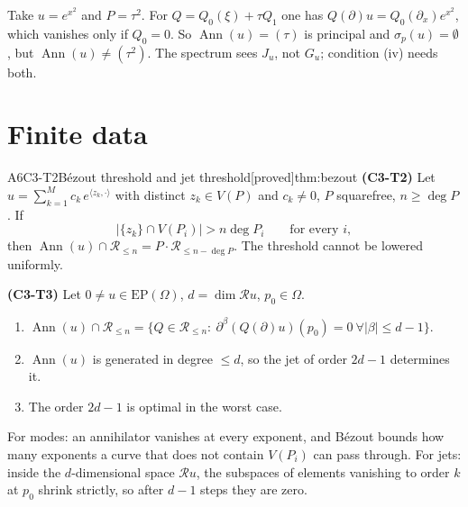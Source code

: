 \documentclass[11pt,a4paper,oneside]{report}
\newcommand{\badge}[2]{\textcolor{#1}{\textsf{\footnotesize[#2]}}}
\newcommand{\proved}{\badge{cC}{proved}}
\newcommand{\Ann}{\operatorname{Ann}}
\newcommand{\EP}{\mathrm{EP}}
\newcommand{\ring}{\mathcal{R}}
\newcommand{\Var}{V}
\DeclareMathOperator{\dimc}{dim}
\newenvironment{dimcard}[5]{\par\Needspace{12\baselineskip}\begin{dimcardbox}{#1}{#2}{#3}{#4}{#5}}{\end{dimcardbox}}
\begin{document}
\begin{caution}[title={An empty spectrum alone is not enough}]
Take $u=e^{x^2}$ and $P=\tau^2$. For $Q=Q_0(\xi)+\tau Q_1$ one has $Q(\partial)u=Q_0(\partial_x)e^{x^2}$, which vanishes only if $Q_0=0$. So $\Ann(u)=(\tau)$ is principal and $\sigma_p(u)=\emptyset$, but $\Ann(u)\ne(\tau^2)$. The spectrum sees $J_u$, not $G_u$; condition (iv) needs both.
\end{caution}

\section{Finite data}

\begin{dimcard}{A6}{C3-T2}{B\'ezout threshold and jet threshold}{\proved}{thm:bezout}
\textbf{(C3-T2)} Let $u=\sum_{k=1}^Mc_k\,e^{\langle z_k,\cdot\rangle}$ with distinct $z_k\in\Var(P)$ and $c_k\ne0$, $P$ squarefree, $n\ge\deg P$. If
\[
\big|\{z_k\}\cap\Var(P_i)\big|>n\deg P_i\qquad\text{for every }i,
\]
then $\Ann(u)\cap\ring_{\le n}=P\cdot\ring_{\le n-\deg P}$. The threshold cannot be lowered uniformly.

\label{dim:C3-T3}\textbf{(C3-T3)} Let $0\ne u\in\EP(\Omega)$, $d=\dimc\ring u$, $p_0\in\Omega$.
\begin{enumerate}[label=(\roman*)]
\item $\Ann(u)\cap\ring_{\le n}=\{Q\in\ring_{\le n}:\ \partial^\beta(Q(\partial)u)(p_0)=0\ \forall|\beta|\le d-1\}$.
\item $\Ann(u)$ is generated in degree $\le d$, so the jet of order $2d-1$ determines it.
\item The order $2d-1$ is optimal in the worst case.
\end{enumerate}
\end{dimcard}

\begin{proofidea}
For modes: an annihilator vanishes at every exponent, and B\'ezout bounds how many exponents a curve that does not contain $\Var(P_i)$ can pass through. For jets: inside the $d$-dimensional space $\ring u$, the subspaces of elements vanishing to order $k$ at $p_0$ shrink strictly, so after $d-1$ steps they are zero.
\end{proofidea}
\end{document}
